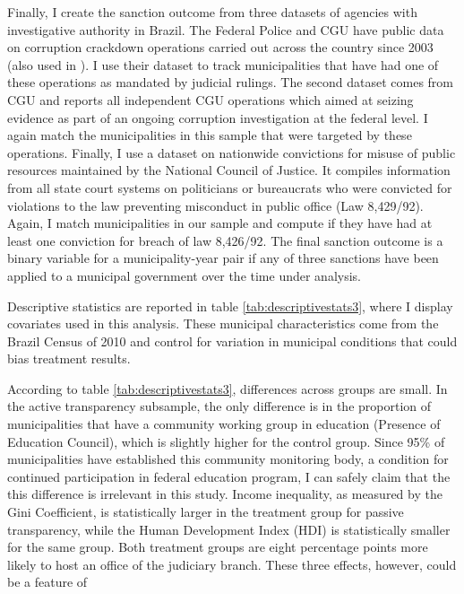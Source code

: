 \documentclass[11pt]{article}
\begin{document}
Finally, I create the sanction outcome from three datasets of agencies with investigative authority in Brazil. The Federal Police and CGU have public data on corruption crackdown operations carried out across the country since 2003 (also used in \citet{FinanGovernmentAuditsReduce2018}). I use their dataset to track municipalities that have had one of these operations as mandated by judicial rulings. The second dataset comes from CGU and reports all independent CGU operations which aimed at seizing evidence as part of an ongoing corruption investigation at the federal level. I again match the municipalities in this sample that were targeted by these operations. Finally, I use a dataset on nationwide convictions for misuse of public resources maintained by the National Council of Justice. It compiles information from all state court systems on politicians or bureaucrats who were convicted for violations to the law preventing misconduct in public office (Law 8,429/92). Again, I match municipalities in our sample and compute if they have had at least one conviction for breach of law 8,426/92. The final sanction outcome is a binary variable for a municipality-year pair if any of three sanctions have been applied to a municipal government over the time under analysis.

Descriptive statistics are reported in table \ref{tab:descriptivestats3}, where I display covariates used in this analysis. These municipal characteristics come from the Brazil Census of 2010 and control for variation in municipal conditions that could bias treatment results.



According to table \ref{tab:descriptivestats3}, differences across groups are small. In the active transparency subsample, the only difference is in the proportion of municipalities that have a community working group in education (Presence of Education Council), which is slightly higher for the control group. Since 95\% of municipalities have established this community monitoring body, a condition for continued participation in federal education program, I can safely claim that the this difference is irrelevant in this study. Income inequality, as measured by the Gini Coefficient, is statistically larger in the treatment group for passive transparency, while the Human Development Index (HDI) is statistically smaller for the same group. Both treatment groups are eight percentage points more likely to host an office of the judiciary branch. These three effects, however, could be a feature of
\end{document}
